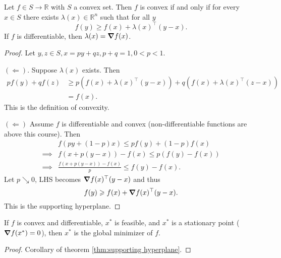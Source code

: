 \begin{theorem}\label{thm:supporting hyperplane}
    Let $f\in S\to \mathbb{R}$ with $S$ a convex set. Then $f$ is convex if and only if for every $x\in S$ there exists $ \lambda(x)\in \mathbb{R}^{n} $ such that for all $y$
    \[
        f(y)\ge f(x) + \lambda(x)^\top (y-x). 
    \]
    If $f$ is differentiable, then $\lambda(x) = \grad f(x)$.
\end{theorem}
\begin{proof}
    Let $ y,z\in S, x = py + qz, p+q=1, 0<p<1 $.

    $ ( \Leftarrow ) $. Suppose $ \lambda(x) $ exists. Then 
    \begin{align*}
        p f(y) + q f(z) &\ge p(f(x)+\lambda(x)^\top(y-x)) + q (f(x)+ \lambda(x)^\top (z-x))\\
        &= f(x). 
    \end{align*}
    This is the definition of convexity. 

    $ ( \Leftarrow) $ Assume $f$ is differentiable and convex (non-differentiable functions are above this course). Then 
    \begin{align*}
        & f(py+(1-p)x) \le pf(y) + (1-p)f(x)\\
        \implies & f(x+p(y-x)) -f(x) \le p(f(y)-f(x))\\ 
        \implies & \frac{f(x+p(y-x))-f(x)}{p} \le f(y)-f(x).
    \end{align*}
    Let $p\searrow 0$, LHS becomes $ \grad f(x)^\top (y-x) $ and thus
    \[
        f(y)\geqslant f(x) + \grad f(x)^\top (y-x).
    \]
    This is the supporting hyperplane.
\end{proof}
\begin{theorem}
    If $f$ is convex and differentiable, $x^*$ is feasible, and $x^*$ is a stationary point ($ \grad f(x^*) = 0 $), then $x^*$ is the global minimizer of $f$.
\end{theorem}
\begin{proof}
    Corollary of theorem \ref{thm:supporting hyperplane}.
\end{proof}

